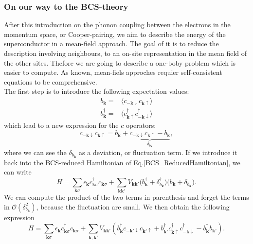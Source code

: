 \documentclass[../main.tex]{subfile}
\begin{document}
\subsubsection{On our way to the BCS-theory}
After this introduction on the phonon coupling between the electrons in the momentum space, or Cooper-pairing,
we aim to describe the energy of the superconductor in a mean-field approach. The goal of it is to reduce the description
involving neighbours, to an on-site representation in the mean field of the other sites. Thefore we are going to describe 
a one-boby problem which is easier to compute. As known, mean-fiels approches requier self-consistent equations to be comprehensive.\\

The first step is to introduce the following expectation values:
\begin{align}
    b_{\bm{k}} = &\langle c_{-\bm{k}\downarrow}c_{\bm{k}\uparrow}\rangle \label{eq:ExpectBCS} \\
    b_{\bm{k}}^{\dagger} = &\langle c_{\bm{k}\uparrow}^{\dagger}c_{-\bm{k}\downarrow}^{\dagger}\rangle  \label{eq:ExpectBCSDag}
\end{align}
which lead to a new expression for the $c$ operators:
\begin{equation}
    c_{-\bm{k}\downarrow}c_{\bm{k}\uparrow} = b_{\bm{k}} + \underbrace{c_{-\bm{k}\downarrow}c_{\bm{k}\uparrow} - b_{\bm{k}}}_{\delta_{b_{\bm{k}}}},
\end{equation}
where we can see the $\delta_{b_{\bm{k}}}$ as a deviation, or fluctuation term. If we introduce it back into the BCS-reduced Hamiltonian of Eq.\ref{BCS_ReducedHamiltonian},
we can write
\[
    H = \sum_{\bm{k}\sigma} \epsilon_{\bm{k}} c_{\bm{k}\sigma}^{\dagger}c_{\bm{k}\sigma} + \sum_{\bm{k}\bm{k}'} V_{\bm{k}\bm{k}'} \bigl( b_{\bm{k}}^{\dagger} + \delta_{b_{\bm{k}}}^{\dagger}\bigr)\bigl( b_{\bm{k}} + \delta_{b_{\bm{k}}}\bigr).
\]
We can compute the product of the two terms in parenthesis and forget the terms in $\mathcal{O}\left(\delta_{b_{\bm{k}}}^2\right)$, because the fluctuation are small.
We then obtain the following expression
\[
    H = \sum_{\bm{k}\sigma} \epsilon_{\bm{k}} c_{\bm{k}\sigma}^{\dagger}c_{\bm{k}\sigma} + \sum_{\bm{k},\bm{k}'} V_{\bm{k}\bm{k}'} \left( b_{\bm{k}}^{\dagger}c_{-\bm{k}'\downarrow}c_{\bm{k}'\uparrow}  + b_{\bm{k}'}^{\dagger} c_{\bm{k}\uparrow} ^{\dagger}c_{-\bm{k}\downarrow}^{\dagger} -  b_{\bm{k}}^{\dagger} b_{\bm{k}'}\right).
\]
\end{document}
